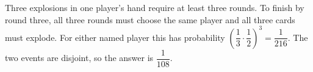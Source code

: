 Three explosions in one player's hand require at least three rounds. To finish by round three, all three rounds must choose the same player and all three cards must explode. For either named player this has probability $\left(\dfrac{1}{3}\cdot\dfrac{1}{2}\right)^3=\dfrac{1}{216}$. The two events are disjoint, so the answer is $\boxed{\dfrac{1}{108}}$.
